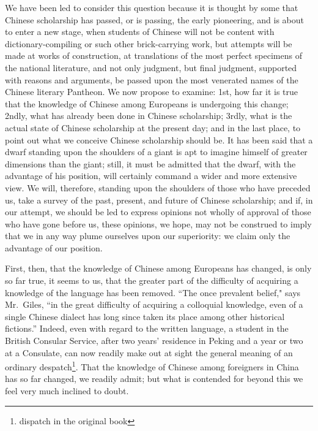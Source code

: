 We have been led to consider this question because it is thought by some that Chinese scholarship has passed, or is passing, the early pioneering, and is about to enter a new stage, when students of Chinese will not be content with dictionary-compiling or such other brick-carrying work, but attempts will be made at works of construction, at translations of the most perfect specimens of the national literature, and not only judgment, but final judgment, supported with reasons and arguments, be passed upon the most venerated names of the Chinese literary Pantheon. 
We now propose to examine: 1st, how far it is true that the knowledge of Chinese among Europeans is undergoing this change; 
2ndly, what has already been done in Chinese scholarship; 
3rdly, what is the actual state of Chinese scholarship at the present day; and in the last place, to point out what we conceive Chinese scholarship should be.
It has been said that a dwarf standing upon the shoulders of a giant is apt to imagine himself of greater dimensions than the giant; still, it must be admitted that the dwarf, with the advantage of his position, will certainly command a wider and more extensive view.
We will, therefore, standing upon the shoulders of those who have preceded us, take a survey of the past, present, and future of Chinese scholarship; and if, in our attempt, we should be led to express opinions not wholly of approval of those who have gone before us, these opinions, we hope, may not be construed to imply that we in any way plume ourselves upon our superiority: we claim only the advantage of our position.

First, then, that the knowledge of Chinese among Europeans has changed, is only so far true, it seems to us, that the greater part of the difficulty of acquiring a knowledge of the language has been removed.
``The once prevalent belief," says Mr.~Giles, ``in the great difficulty of acquiring a colloquial knowledge, even of a single Chinese dialect has long since taken its place among other historical fictions.''
Indeed, even with regard to the written language, a student in the British Consular Service, after two years' residence in Peking and a year or two at a Consulate, can now readily make out at sight the general meaning of an ordinary despatch\footnote{dispatch in the original book}.
That the knowledge of Chinese among foreigners in China has so far changed, we readily admit; but what is contended for beyond this we feel very much inclined to doubt.

